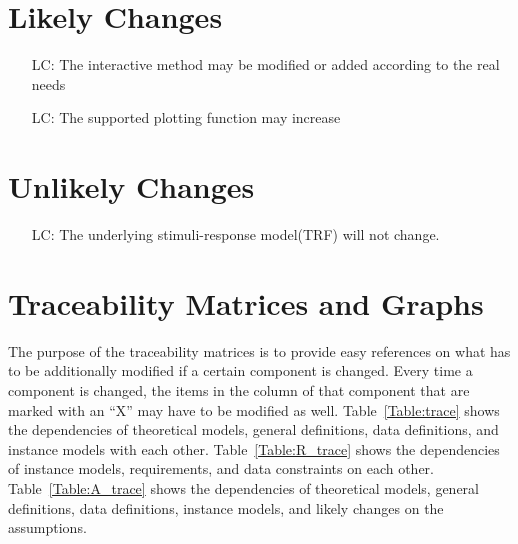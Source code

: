 \documentclass[12pt]{article}
\newcounter{lcnum} %
\begin{document}
%

\section{Likely Changes}    

\noindent \begin{itemize}

\item[LC\refstepcounter{lcnum}\thelcnum\label{LC_meaningfulLabel}:]
The interactive method may be modified or added according to the real needs
\item[LC\refstepcounter{lcnum}\thelcnum\label{LC_meaningfulLabel}:]
The supported plotting function may increase

\end{itemize}

\section{Unlikely Changes}    

\noindent \begin{itemize}

\item[LC\refstepcounter{lcnum}\thelcnum\label{LC_meaningfulLabel}:]
The underlying stimuli-response model(TRF) will not change.

\end{itemize}

\section{Traceability Matrices and Graphs}

The purpose of the traceability matrices is to provide easy references on what
has to be additionally modified if a certain component is changed.  Every time a
component is changed, the items in the column of that component that are marked
with an ``X'' may have to be modified as well.  Table~\ref{Table:trace} shows the
dependencies of theoretical models, general definitions, data definitions, and
instance models with each other. Table~\ref{Table:R_trace} shows the
dependencies of instance models, requirements, and data constraints on each
other. Table~\ref{Table:A_trace} shows the dependencies of theoretical models,
general definitions, data definitions, instance models, and likely changes on
the assumptions.
\end{document}
